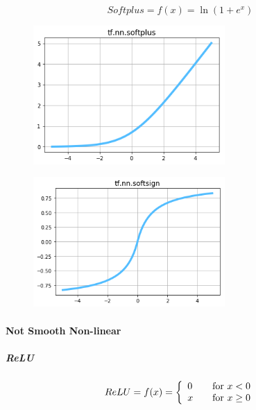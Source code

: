 
\begin{equation}
{
	Softplus = f(x) = \ln{(1+e^x)}
}
\label{eq:act_softplus_def}
\end{equation}


\begin{figure}
	\centering
	\includegraphics[width=0.65\textwidth]{./sync_imgs/act/smooth/softplus.png}
	\label{fig:act_smooth_softplus}
\end{figure}

\begin{figure}
	\centering
	\includegraphics[width=0.65\textwidth]{./sync_imgs/act/smooth/softsign.png}
	\label{fig:act_smooth_softsign}
\end{figure}


\paragraph{Not Smooth Non-linear}

\subparagraph{ReLU}

\begin{equation}
{
	ReLU = f(x) = \left\{
	\begin{array}{ll}
	0 & \quad $for$ \ x < 0 \\
	x & \quad $for$ \ x \ge 0
	\end{array}
	\right.
}
\label{eq:act_relu_def}
\end{equation}

